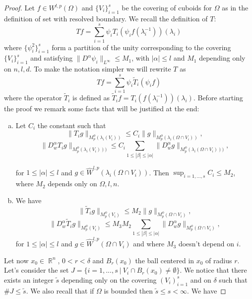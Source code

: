 \documentclass[12pt]{article}
\theoremstyle{definition}
\DeclareMathOperator\rr{\mathbb{R}}
\begin{document}
\begin{proof}
Let $f \in W^{l,p}(\Omega)$ and  $\{V_i\}_{i=1}^s$ be the covering of cuboids for $\Omega$ as in the definition of set with resolved boundary. We recall the definition of $T:$
\[ Tf = \sum_{i=1}^s \psi_iT_i(\psi_if(\lambda_i^{-1}))(\lambda_i)\]
where $\{ \psi^2_i \}_{i=1}^s$ form a partition of the unity corresponding to the covering $\{V_i\}_{i=1}^s$ and satisfying $\|D^\alpha \psi_i \|_{L^\infty}\le M_1$, with $|\alpha|\le l$ and $M_1$ depending only on $n,l,d$. To make the notation simpler we will rewrite $T$ as
\[ Tf = \sum_{i=1}^s \psi_i\widetilde T_i(\psi_if)\]
where the operator $\widetilde T_i$ is defined as $\widetilde T_i f = T_i(f(\lambda_i^{-1}))(\lambda_i)$. 
Before starting the proof we remark some facts that will be justified at the end:
\begin{enumerate}[a)]

\item Let $C_i$ the constant such that
\[ \| T_ig\|_{M_p^\phi(\lambda_i(V_i))}\le C_i \|g\|_{M_p^\phi(\lambda_i(\Omega \cap V_i))},\]
\[\| D^\alpha_w T_ig\|_{M_p^\phi(\lambda_i(V_i)))} \le   C_i\sum_{1\le |\beta|\le|\alpha| }\| D^\alpha_wg\|_{M_p^\phi(\lambda_i(\Omega \cap V_i)))},\]  

for $1\le |\alpha|\le l$ and $g \in \widehat W^{l,p}(\lambda_i(\Omega \cap V_i))$. Then $\sup_{i=1,...,s} C_i \le M_2$, where $M_2$ depends only on $\Omega,l,n$.
\item We have
\[ \| \widetilde T_ig\|_{M_p^\phi(V_i)}\le M_2 \|g\|_{M_p^\phi(\Omega \cap V_i)},\]
\[\| D^\alpha_w \widetilde T_ig\|_{M_p^\phi(V_i)} \le   M_3M_2\sum_{1\le |\beta|\le|\alpha| }\| D^\alpha_wg\|_{M_p^\phi(\Omega \cap V_i)},\]  
for $1\le |\alpha|\le l$ and $g \in \widehat W^{l,p}(\Omega \cap V_i)$ and where $M_3$ doesn't depend on $i$. 
\end{enumerate}
Let now $x_0 \in \rr^n$, $0<r<\delta$ and $B_r(x_0)$ the ball centered in $x_0$ of radius $r.$ Let's consider the set $J=\{ i=1,...,s \ | \ V_i \cap B_r(x_0) \neq \emptyset\}.$
We notice that there exists an integer $\widetilde s$ depending only on the covering $(V_i)_{i=1}^s$ and on $\delta$ such that $\# J\le \widetilde s.$ We also recall that if $\Omega$ is bounded then $\widetilde s\le s<\infty$. We have




\end{proof}
\end{document}
